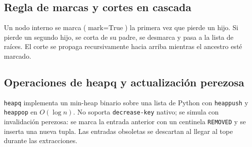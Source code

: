 \subsection{Regla de marcas y cortes en cascada}
Un nodo interno se marca ($\text{mark} = \text{True}$) la primera vez que pierde un hijo. Si pierde un segundo hijo, se corta de su padre, se desmarca y pasa a la lista de raíces. El corte se propaga recursivamente hacia arriba mientras el ancestro esté marcado.

\subsection{Operaciones de heapq y actualización perezosa}
\texttt{heapq} implementa un min-heap binario sobre una lista de Python con \texttt{heappush} y \texttt{heappop} en $O(\log n)$. No soporta \texttt{decrease-key} nativo; se simula con invalidación perezosa: se marca la entrada anterior con un centinela \texttt{REMOVED} y se inserta una nueva tupla. Las entradas obsoletas se descartan al llegar al tope durante las extracciones.
